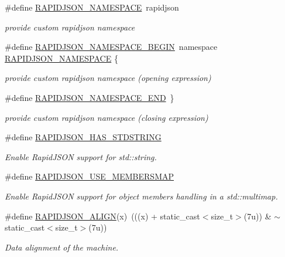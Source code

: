 \begin{DoxyCompactItemize}
\#define \hyperlink{group__RAPIDJSON__CONFIG_ga743a79d3af927391fe3eb5c979136899}{R\+A\+P\+I\+D\+J\+S\+O\+N\+\_\+\+N\+A\+M\+E\+S\+P\+A\+CE}~rapidjson
\begin{DoxyCompactList}\small\item\em provide custom rapidjson namespace \end{DoxyCompactList}\item 
\#define \hyperlink{group__RAPIDJSON__CONFIG_gad3806c8251fdc7da9618b7e922674ffc}{R\+A\+P\+I\+D\+J\+S\+O\+N\+\_\+\+N\+A\+M\+E\+S\+P\+A\+C\+E\+\_\+\+B\+E\+G\+IN}~namespace \hyperlink{group__RAPIDJSON__CONFIG_ga743a79d3af927391fe3eb5c979136899}{R\+A\+P\+I\+D\+J\+S\+O\+N\+\_\+\+N\+A\+M\+E\+S\+P\+A\+CE} \{
\begin{DoxyCompactList}\small\item\em provide custom rapidjson namespace (opening expression) \end{DoxyCompactList}\item 
\#define \hyperlink{group__RAPIDJSON__CONFIG_gaf18f052a98b9f5df5448d39484b743c1}{R\+A\+P\+I\+D\+J\+S\+O\+N\+\_\+\+N\+A\+M\+E\+S\+P\+A\+C\+E\+\_\+\+E\+ND}~\}
\begin{DoxyCompactList}\small\item\em provide custom rapidjson namespace (closing expression) \end{DoxyCompactList}\item 
\#define \hyperlink{group__RAPIDJSON__CONFIG_ga2f2eef0ee4477f3fe5874703a66e997f}{R\+A\+P\+I\+D\+J\+S\+O\+N\+\_\+\+H\+A\+S\+\_\+\+S\+T\+D\+S\+T\+R\+I\+NG}
\begin{DoxyCompactList}\small\item\em Enable Rapid\+J\+S\+ON support for {\ttfamily std\+::string}. \end{DoxyCompactList}\item 
\#define \hyperlink{group__RAPIDJSON__CONFIG_ga87dc65109882910388121e1dba15038b}{R\+A\+P\+I\+D\+J\+S\+O\+N\+\_\+\+U\+S\+E\+\_\+\+M\+E\+M\+B\+E\+R\+S\+M\+AP}
\begin{DoxyCompactList}\small\item\em Enable Rapid\+J\+S\+ON support for object members handling in a {\ttfamily std\+::multimap}. \end{DoxyCompactList}\item 
\#define \hyperlink{group__RAPIDJSON__CONFIG_ga583915242504c7fdb36e826f02f76242}{R\+A\+P\+I\+D\+J\+S\+O\+N\+\_\+\+A\+L\+I\+GN}(x)~(((x) + static\+\_\+cast$<$size\+\_\+t$>$(7u)) \& $\sim$static\+\_\+cast$<$size\+\_\+t$>$(7u))
\begin{DoxyCompactList}\small\item\em Data alignment of the machine. \end{DoxyCompactList}\item 

\end{DoxyCompactItemize}
